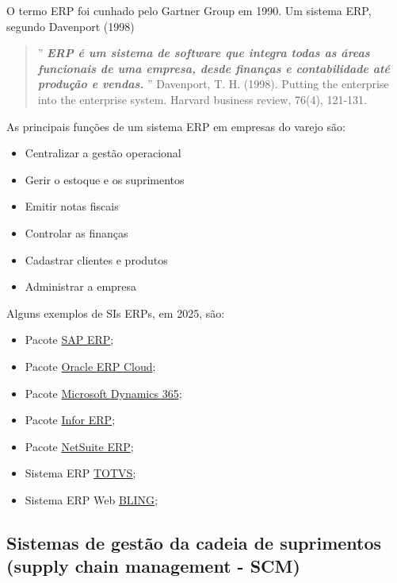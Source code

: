 \documentclass[
]{book}
\begin{document}
O termo ERP foi cunhado pelo Gartner Group em 1990. Um sistema ERP, segundo Davenport (1998)

\begin{quote}
'' \textbf{\emph{ERP é um sistema de software que integra todas as áreas funcionais de uma empresa, desde finanças e contabilidade até produção e vendas.}} '' Davenport, T. H. (1998). Putting the enterprise into the enterprise system. Harvard business review, 76(4), 121-131.
\end{quote}

As principais funções de um sistema ERP em empresas do varejo são:

\begin{itemize}
\item
  Centralizar a gestão operacional
\item
  Gerir o estoque e os suprimentos
\item
  Emitir notas fiscais
\item
  Controlar as finanças
\item
  Cadastrar clientes e produtos
\item
  Administrar a empresa
\end{itemize}

Alguns exemplos de SIs ERPs, em 2025, são:

\begin{itemize}
\item
  Pacote \href{https://www.sap.com/brazil/products/erp.html}{SAP ERP};
\item
  Pacote \href{https://www.oracle.com/br/erp/}{Oracle ERP Cloud};
\item
  Pacote \href{https://www.microsoft.com/pt-br/dynamics-365/pricing-overview}{Microsoft Dynamics 365};
\item
  Pacote \href{https://www.infor.com/pt-br}{Infor ERP};
\item
  Pacote \href{https://www.netsuite.com/portal/br/products/erp.shtml}{NetSuite ERP};
\item
  Sistema ERP \href{https://www.totvs.com/sistema-de-gestao/}{TOTVS};
\item
  Sistema ERP Web \href{https://www.bling.com.br/}{BLING};
\end{itemize}

\subsection{Sistemas de gestão da cadeia de suprimentos (supply chain management - SCM)}\label{sistemas-de-gestuxe3o-da-cadeia-de-suprimentos-supply-chain-management---scm}
\end{document}
